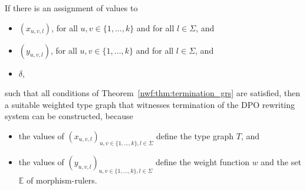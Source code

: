 If there is an assignment of values to 
    \begin{itemize}
        \item $(x_{u,v,l})$, for all $u,v \mathop{\in} \{1,...,k\}$ and for all $l \mathop{\in} \Sigma$, and
        \item $(y_{u,v,l})$, for all $u,v \mathop{\in} \{1,...,k\}$ and for all $l \mathop{\in} \Sigma$, and
        \item $\delta$,
    \end{itemize} 
    such that all conditions of Theorem~\ref{nwf:thm:termination_grs} are satisfied, then a suitable weighted type graph that witnesses termination of the DPO rewriting system can be constructed, because
    \begin{itemize}
        \item the values of \( (x_{u,v,l})_{u,v \mathop{\in} \{1,...,k\}, l \mathop{\in} \Sigma} \) define the type graph $T$, and
        \item the values of \( (y_{u,v,l})_{u,v \mathop{\in} \{1,...,k\}, l \mathop{\in} \Sigma} \) define the weight function $w$ and the set $\mathbb{E}$ of morphism-rulers.
    \end{itemize} 